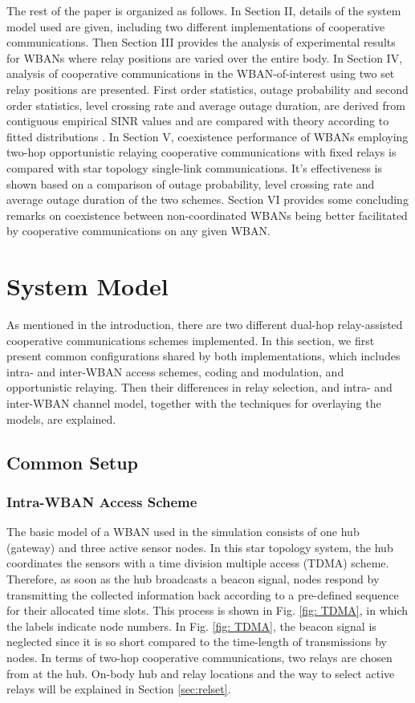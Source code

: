 \documentclass[12pt,draftcls,a4paper,onecolumn,journal]{IEEEtran}
\begin{document}
The rest of the paper is organized as follows. In Section II, details of the system model used are given, including two different implementations of cooperative communications. Then Section III provides the analysis of experimental results for WBANs where relay positions are varied over the entire body. In Section IV, analysis of cooperative communications in the WBAN-of-interest using two set relay positions are presented. First order statistics, outage probability and second order statistics, level crossing rate and average outage duration, are derived from contiguous empirical SINR values and are compared with theory according to fitted distributions . In Section V, coexistence performance of WBANs employing two-hop opportunistic relaying cooperative communications with fixed relays is compared with star topology single-link communications. It's effectiveness is shown based on a comparison of outage probability, level crossing rate and average outage duration of the two schemes. Section VI provides some concluding remarks on coexistence between non-coordinated WBANs being better facilitated by cooperative communications on any given WBAN.


\section{System Model}
As mentioned in the introduction, there are two different dual-hop relay-assisted cooperative communications schemes implemented. In this section, we first present common configurations shared by both implementations, which includes intra- and inter-WBAN access schemes, coding and modulation, and opportunistic relaying. Then their differences in relay selection, and intra- and inter-WBAN channel model, together with the techniques for overlaying the models, are explained.

\subsection{Common Setup}
\subsubsection{Intra-WBAN Access Scheme}
The basic model of a WBAN used in the simulation consists of one hub (gateway) and three active sensor nodes. In this star topology system, the hub coordinates the sensors with a time division multiple access (TDMA) scheme. Therefore, as soon as the hub broadcasts a beacon signal, nodes respond by transmitting the collected information back according to a pre-defined sequence for their allocated time slots. This process is shown in Fig. \ref{fig: TDMA}, in which the labels indicate node numbers. In Fig. \ref{fig: TDMA}, the beacon signal is neglected since it is so short compared to the time-length of transmissions by nodes. In terms of two-hop cooperative communications, two relays are chosen from at the hub. On-body hub and relay locations and the way to select active relays will be explained in Section \ref{sec:relset}.
\end{document}
